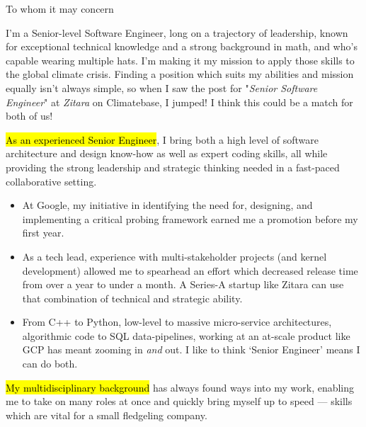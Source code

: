 \documentclass{tc_cv}
\begin{document}

\begin{adjustwidth}{38pt}{38pt}

  To whom it may concern\par \bigskip

  I'm a Senior-level Software Engineer, long on a trajectory of leadership,
  known for exceptional technical knowledge and a strong background in math,
  and who's capable wearing multiple hats. I'm making it my mission to apply
  those skills to the global climate crisis. Finding a position which suits my
  abilities and mission equally isn't always simple, so when I saw the post for
  "\emph{Senior Software Engineer}" at \emph{Zitara} on Climatebase, I jumped!
  I think this could be a match for both of us! \medskip

  \hl{As an experienced Senior Engineer}, I bring both a high level of software
  architecture and design know-how as well as expert coding skills, all while
  providing the strong leadership and strategic thinking needed in a fast-paced
  collaborative setting.
  \begin{itemize}

    \item At Google, my initiative in identifying the need for, designing, and
      implementing a critical probing framework earned me a promotion before my
      first year.

    \item As a tech lead, experience with multi-stakeholder projects (and
      kernel development) allowed me to spearhead an effort which decreased
      release time from over a year to under a month. A Series-A startup like
      Zitara can use that combination of technical and strategic ability.

    \item From C++ to Python, low-level to massive micro-service architectures,
      algorithmic code to SQL data-pipelines, working at an at-scale product
      like GCP has meant zooming in \emph{and} out. I like to think `Senior
      Engineer' means I can do both.

  \end{itemize} \medskip

  \hl{My multidisciplinary background} has always found ways into my work,
  enabling me to take on many roles at once and quickly bring myself up to
  speed --- skills which are vital for a small fledgeling company.
  \begin{itemize}


\end{itemize}
\end{adjustwidth}
\end{document}
